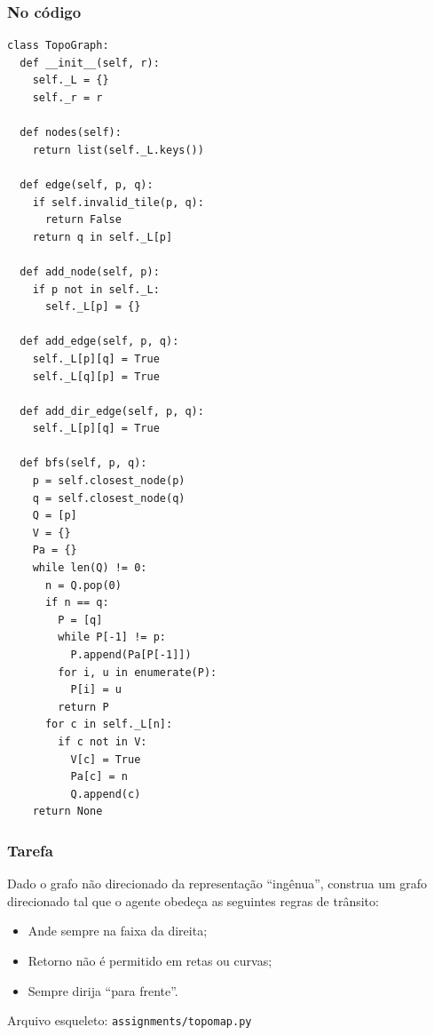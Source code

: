 \documentclass{beamer}
\begin{document}
\begin{frame}[fragile]
  \frametitle{No código}

  \scriptsize
  \begin{multicols}{2}
  \begin{verbatim}
class TopoGraph:
  def __init__(self, r):
    self._L = {}
    self._r = r

  def nodes(self):
    return list(self._L.keys())

  def edge(self, p, q):
    if self.invalid_tile(p, q):
      return False
    return q in self._L[p]

  def add_node(self, p):
    if p not in self._L:
      self._L[p] = {}

  def add_edge(self, p, q):
    self._L[p][q] = True
    self._L[q][p] = True

  def add_dir_edge(self, p, q):
    self._L[p][q] = True

  def bfs(self, p, q):
    p = self.closest_node(p)
    q = self.closest_node(q)
    Q = [p]
    V = {}
    Pa = {}
    while len(Q) != 0:
      n = Q.pop(0)
      if n == q:
        P = [q]
        while P[-1] != p:
          P.append(Pa[P[-1]])
        for i, u in enumerate(P):
          P[i] = u
        return P
      for c in self._L[n]:
        if c not in V:
          V[c] = True
          Pa[c] = n
          Q.append(c)
    return None

  \end{verbatim}
  \end{multicols}
\end{frame}

\begin{frame}
  \frametitle{Tarefa}

  Dado o grafo não direcionado da representação ``ingênua'', construa um grafo direcionado tal que
  o agente obedeça as seguintes regras de trânsito:
  \vspace{0.5cm}

  \begin{itemize}
    \item Ande sempre na faixa da direita;
    \item Retorno não é permitido em retas ou curvas;
    \item Sempre dirija ``para frente''.
  \end{itemize}
  \vspace{0.5cm}

  Arquivo esqueleto: \texttt{assignments/topomap.py}
\end{frame}
\end{document}
